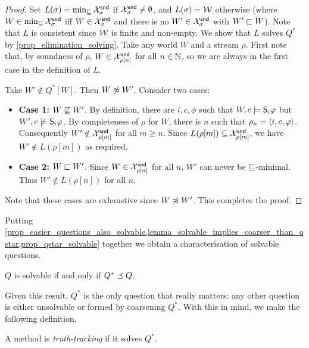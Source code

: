 \begin{proof}
    Set $L(\sigma) = \min_{\specleq}{\Xsnd_\sigma}$ if $\Xsnd_\sigma \ne
    \emptyset$, and $L(\sigma) = \worlds$ otherwise (where $W \in
    \min_{\specleq}{\Xsnd_\sigma}$ iff $W \in \Xsnd_\sigma$ and there is no
    $W' \in \Xsnd_\sigma$ with $W' \speclt W$). Note that $L$ is consistent
    since $\worlds$ is finite and non-empty. We show that $L$ solves $Q^*$ by
    \cref{prop_elimination_solving}. Take any world $W$ and a stream $\rho$.
    First note that, by soundness of $\rho$, $W \in \Xsnd_{\rho[n]}$ for all $n
    \in \N$, so we are always in the first case in the definition of $L$.

    Take $W' \notin Q^*[W]$. Then $W \not\speceq W'$. Consider two cases:
    \begin{itemize}
        \item \textbf{Case 1:} $W \not\specleq W'$. By definition, there are
              $i, c, \phi$ such that $W, c \models \S_i\phi$ but $W', c
              \not\models \S_i\phi$. By completeness of $\rho$ for $W$, there
              is $n$ such that $\rho_n = \tuple{i, c, \phi}$. Consequently $W'
              \notin \Xsnd_{\rho[m]}$ for all $m \ge n$. Since $L(\rho[m])
              \subseteq \Xsnd_{\rho[m]}$, we have $W' \notin L(\rho[m])$ as
              required.

        \item \textbf{Case 2:} $W \speclt W'$. Since $W \in \Xsnd_{\rho[n]}$
              for all $n$, $W'$ can never be $\specleq$-minimal. Thus $W'
              \notin L(\rho[n])$ for all $n$.
    \end{itemize}
    Note that these cases are exhaustive since $W \not\speceq W'$. This
    completes the proof.
\end{proof}

Putting
\cref{prop_easier_questions_also_solvable,lemma_solvable_implies_coarser_than_qstar,prop_qstar_solvable}
together we obtain a characterisation of solvable questions.

\begin{theorem}
    \label{thm_solvability_characterisation}
    $Q$ is solvable if and only if $Q^* \refines Q$.
\end{theorem}

Given this result, $Q^*$ is the only question that really matters: any other
question is either unsolvable or formed by coarsening $Q^*$. With this in mind,
we make the following definition.

\begin{definition}
    \label{def_truthtracking}
    A method is \emph{truth-tracking} if it solves $Q^*$.
\end{definition}

